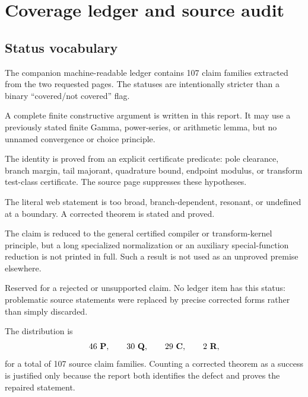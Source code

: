 \section{Coverage ledger and source audit}\label{sec:coverage}

\subsection{Status vocabulary}

The companion machine-readable ledger contains 107 claim families extracted
from the two requested pages.  The statuses are intentionally stricter than a
binary ``covered/not covered'' flag.

\begin{description}[style=nextline,leftmargin=3.2em]
\item[\statusP\ --- proved]
A complete finite constructive argument is written in this report.  It may use
a previously stated finite Gamma, power-series, or arithmetic lemma, but no
unnamed convergence or choice principle.
\item[\statusQ\ --- quantitatively conditional]
The identity is proved from an explicit certificate predicate: pole clearance,
branch margin, tail majorant, quadrature bound, endpoint modulus, or transform
test-class certificate.  The source page suppresses these hypotheses.
\item[\statusC\ --- corrected]
The literal web statement is too broad, branch-dependent, resonant, or
undefined at a boundary.  A corrected theorem is stated and proved.
\item[\statusR\ --- reduced]
The claim is reduced to the general certified compiler or transform-kernel
principle, but a long specialized normalization or an auxiliary
special-function reduction is not printed in full.  Such a result is not used
as an unproved premise elsewhere.
\item[\statusX\ --- not established]
Reserved for a rejected or unsupported claim.  No ledger item has this status:
problematic source statements were replaced by precise corrected forms rather
than simply discarded.
\end{description}

The distribution is
\[
 46\ \textbf{P},\qquad 30\ \textbf{Q},\qquad
 29\ \textbf{C},\qquad 2\ \textbf{R},
\]
for a total of 107 source claim families.  Counting a corrected theorem as a
success is justified only because the report both identifies the defect and
proves the repaired statement.

